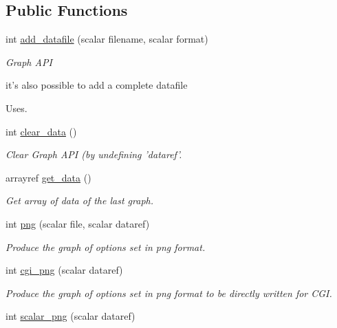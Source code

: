 \subsection*{Public Functions}
\label{_amgrpda6bc86800313ecde6e56bd1b41a7c55}
 \begin{DoxyCompactItemize}
\item 
int \hyperlink{classChart_1_1Base_a57eedac06ec67f93222bbe1a2930b606}{add\_\-datafile} (scalar filename, scalar format)
\begin{DoxyCompactList}\small\item\em Graph API\par
 it's also possible to add a complete datafile\par
 Uses. \item\end{DoxyCompactList}\item 
int \hyperlink{classChart_1_1Base_a99372014f79c259968b77c93eaddaf1a}{clear\_\-data} ()
\begin{DoxyCompactList}\small\item\em Clear Graph API (by undefining 'dataref'. \item\end{DoxyCompactList}\item 
arrayref \hyperlink{classChart_1_1Base_abafa3dfccde44d267a6aea07ad2a1274}{get\_\-data} ()
\begin{DoxyCompactList}\small\item\em Get array of data of the last graph. \item\end{DoxyCompactList}\item 
int \hyperlink{classChart_1_1Base_ac6b44856256fb2aa1bb40ee716431028}{png} (scalar file, scalar dataref)
\begin{DoxyCompactList}\small\item\em Produce the graph of options set in png format. \item\end{DoxyCompactList}\item 
int \hyperlink{classChart_1_1Base_a887fdd48d80d348d6a38ad799356b0ec}{cgi\_\-png} (scalar dataref)
\begin{DoxyCompactList}\small\item\em Produce the graph of options set in png format to be directly written for CGI. \item\end{DoxyCompactList}\item 
int \hyperlink{classChart_1_1Base_ad6bc3855bdc31bc6e264e390f5e660c2}{scalar\_\-png} (scalar dataref)

\end{DoxyCompactItemize}
